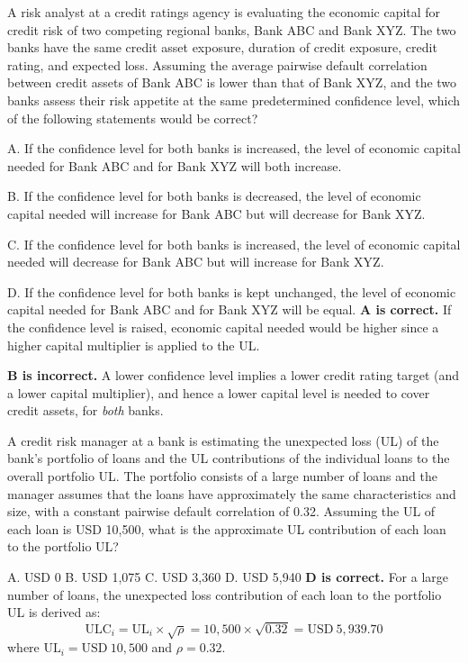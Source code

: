 \begin{crexbox}
A risk analyst at a credit ratings agency is evaluating the economic capital for
credit risk of two competing regional banks, Bank ABC and Bank XYZ. The two banks
have the same credit asset exposure, duration of credit exposure, credit rating,
and expected loss. Assuming the average pairwise default correlation between
credit assets of Bank ABC is lower than that of Bank XYZ, and the two banks assess
their risk appetite at the same predetermined confidence level, which of the
following statements would be correct?

\smallskip
A. If the confidence level for both banks is increased, the level of economic
capital needed for Bank ABC and for Bank XYZ will both increase.

B. If the confidence level for both banks is decreased, the level of economic
capital needed will increase for Bank ABC but will decrease for Bank XYZ.

C. If the confidence level for both banks is increased, the level of economic
capital needed will decrease for Bank ABC but will increase for Bank XYZ.

D. If the confidence level for both banks is kept unchanged, the level of
economic capital needed for Bank ABC and for Bank XYZ will be equal.
\tcblower
\textbf{A is correct.} If the confidence level is raised, economic capital needed
would be higher since a higher capital multiplier is applied to the UL.

\textbf{B is incorrect.} A lower confidence level implies a lower credit rating
target (and a lower capital multiplier), and hence a lower capital level is
needed to cover credit assets, for \emph{both} banks.
\end{crexbox}

\begin{crexbox}
A credit risk manager at a bank is estimating the unexpected loss (UL) of the
bank's portfolio of loans and the UL contributions of the individual loans to the
overall portfolio UL. The portfolio consists of a large number of loans and the
manager assumes that the loans have approximately the same characteristics and
size, with a constant pairwise default correlation of 0.32. Assuming the UL of
each loan is USD 10,500, what is the approximate UL contribution of each loan to
the portfolio UL?

\smallskip
A. USD 0 \qquad B. USD 1,075 \qquad C. USD 3,360 \qquad D. USD 5,940
\tcblower
\textbf{D is correct.} For a large number of loans, the unexpected loss
contribution of each loan to the portfolio UL is derived as:
\[ \mathrm{ULC}_i = \mathrm{UL}_i \times \sqrt{\rho}
 = 10{,}500 \times \sqrt{0.32} = \mathrm{USD}\ 5{,}939.70 \]
where $\mathrm{UL}_i = \mathrm{USD}\ 10{,}500$ and $\rho = 0.32$.
\end{crexbox}


